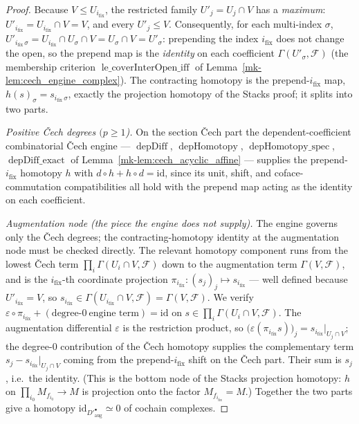 \begin{proof}
  Because \(V \le U_{i_{\mathrm{fix}}}\), the restricted family \(U'_j = U_j \cap V\) has a
  \emph{maximum}: \(U'_{i_{\mathrm{fix}}} = U_{i_{\mathrm{fix}}} \cap V = V\), and every
  \(U'_j \le V\). Consequently, for each multi-index \(\sigma\),
  \(U'_{i_{\mathrm{fix}}\,\sigma} = U_{i_{\mathrm{fix}}} \cap U_\sigma \cap V = U_\sigma \cap
  V = U'_\sigma\): prepending the index \(i_{\mathrm{fix}}\) does not change the open, so the
  prepend map is the \emph{identity} on each coefficient \(\Gamma(U'_\sigma, \mathcal{F})\)
  (the membership criterion \(\operatorname{le\_coverInterOpen\_iff}\) of
  Lemma~\ref{mk-lem:cech_engine_complex}). The contracting homotopy is the prepend-\(i_{\mathrm{fix}}\)
  map, \(h(s)_\sigma = s_{i_{\mathrm{fix}}\,\sigma}\), exactly the projection homotopy of the
  Stacks proof; it splits into two parts.

  \emph{Positive {\v C}ech degrees \((p \ge 1\)).} On the section {\v C}ech part the
  dependent-coefficient combinatorial {\v C}ech engine --- \(\operatorname{depDiff}\),
  \(\operatorname{depHomotopy}\), \(\operatorname{depHomotopy\_spec}\),
  \(\operatorname{depDiff\_exact}\) of Lemma~\ref{mk-lem:cech_acyclic_affine} --- supplies the
  prepend-\(i_{\mathrm{fix}}\) homotopy \(h\) with
  \(d \circ h + h \circ d = \mathrm{id}\), since its unit, shift, and coface-commutation
  compatibilities all hold with the prepend map acting as the identity on each coefficient.

  \emph{Augmentation node (the piece the engine does not supply).} The engine governs only the
  {\v C}ech degrees; the contracting-homotopy identity at the augmentation node must be checked
  directly. The relevant homotopy component runs from the lowest {\v C}ech term
  \(\prod_i \Gamma(U_i \cap V, \mathcal{F})\) down to the augmentation term
  \(\Gamma(V, \mathcal{F})\), and is the \(i_{\mathrm{fix}}\)-th coordinate projection
  \(\pi_{i_{\mathrm{fix}}} : (s_j)_j \mapsto s_{i_{\mathrm{fix}}}\) --- well defined because
  \(U'_{i_{\mathrm{fix}}} = V\), so \(s_{i_{\mathrm{fix}}} \in \Gamma(U_{i_{\mathrm{fix}}} \cap V,
  \mathcal{F}) = \Gamma(V, \mathcal{F})\). We verify
  \(\varepsilon \circ \pi_{i_{\mathrm{fix}}} + (\text{degree-}0\ \text{engine term}) = \mathrm{id}\)
  on \(s \in \prod_i \Gamma(U_i \cap V, \mathcal{F})\). The augmentation differential
  \(\varepsilon\) is the restriction product, so
  \(\bigl(\varepsilon(\pi_{i_{\mathrm{fix}}} s)\bigr)_j = s_{i_{\mathrm{fix}}}|_{U_j \cap V}\); the
  degree-\(0\) contribution of the {\v C}ech homotopy supplies the complementary term
  \(s_j - s_{i_{\mathrm{fix}}}|_{U_j \cap V}\) coming from the prepend-\(i_{\mathrm{fix}}\) shift on
  the {\v C}ech part. Their sum is \(s_j\), i.e.\ the identity. (This is the bottom node of the
  Stacks projection homotopy: \(h\) on \(\prod_{i_0} M_{f_{i_0}} \to M\) is projection onto the
  factor \(M_{f_{i_{\mathrm{fix}}}} = M\).) Together the two parts give a homotopy
  \(\mathrm{id}_{D'^\bullet_{\mathrm{aug}}} \simeq 0\) of cochain complexes.
\end{proof}

